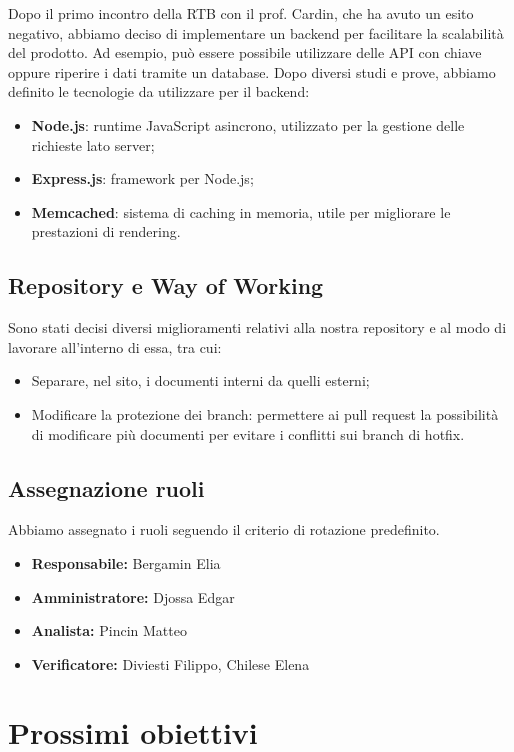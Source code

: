 Dopo il primo incontro della RTB con il prof. Cardin, che ha avuto un esito negativo, abbiamo deciso di implementare un backend per facilitare la scalabilità del prodotto. Ad esempio, può essere possibile utilizzare delle API con chiave oppure riperire i dati tramite un database. Dopo diversi studi e prove, abbiamo definito le tecnologie da utilizzare per il backend:

\begin{itemize}
\item \textbf{Node.js}: runtime JavaScript asincrono, utilizzato per la gestione delle richieste lato server;
\item \textbf{Express.js}: framework per Node.js;
\item \textbf{Memcached}: sistema di caching in memoria, utile per migliorare le prestazioni di rendering.
\end{itemize}

\subsection{Repository e Way of Working}
Sono stati decisi diversi miglioramenti relativi alla nostra repository e al modo di lavorare all'interno di essa, tra cui:
\begin{itemize}
    \item Separare, nel sito, i documenti interni da quelli esterni;
    \item Modificare la protezione dei branch: permettere ai pull request la possibilità di modificare più documenti per evitare i conflitti sui branch di hotfix.
\end{itemize}

\subsection{Assegnazione ruoli}
Abbiamo assegnato i ruoli seguendo il criterio di rotazione predefinito.

\begin{itemize}
    \item \textbf{Responsabile:}  Bergamin Elia
    \item \textbf{Amministratore:} Djossa Edgar
    \item \textbf{Analista:} Pincin Matteo
    \item \textbf{Verificatore:} Diviesti Filippo,  Chilese Elena
\end{itemize}

\section{Prossimi obiettivi}

